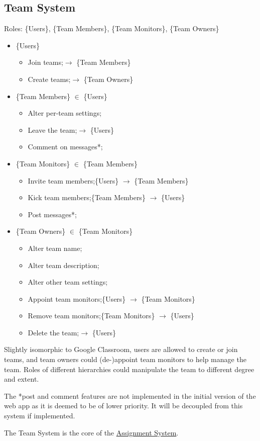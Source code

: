 \documentclass[12pt]{report}
\newcommand{\n}{\par}
\newcommand{\br}{\vspace{1 em}\n}
\begin{document}
\subsection{Team System} \label{overview.project-objectives.team-system}
Roles: \{Users\}, \{Team Members\}, \{Team Monitors\}, \{Team Owners\}\n
\begin{itemize}
	\item \{Users\}
	      \begin{itemize}
		      \item Join teams;\null\hfill $\rightarrow$ \{Team Members\}
		      \item Create teams;\null\hfill $\rightarrow$ \{Team Owners\}
	      \end{itemize}
	\item \{Team Members\} $\in$ \{Users\}
	      \begin{itemize}
		      \item Alter per-team settings;
		      \item Leave the team;\null\hfill $\rightarrow$ \{Users\}
		      \item Comment on messages*;
	      \end{itemize}
	\item \{Team Monitors\} $\in$ \{Team Members\}
	      \begin{itemize}
		      \item Invite team members;\null\hfill \{Users\} $\rightarrow$ \{Team Members\}
		      \item Kick team members;\null\hfill \{Team Members\} $\rightarrow$ \{Users\}
		      \item Post messages*;
	      \end{itemize}
	\item \{Team Owners\} $\in$ \{Team Monitors\}
	      \begin{itemize}
		      \item Alter team name;
		      \item Alter team description;
		      \item Alter other team settings;
		      \item Appoint team monitors;\null\hfill \{Users\} $\rightarrow$ \{Team Monitors\}
		      \item Remove team monitors;\null\hfill \{Team Monitors\} $\rightarrow$ \{Users\}
		      \item Delete the team;\null\hfill $\rightarrow$ \{Users\}
	      \end{itemize}
\end{itemize}\n
Slightly isomorphic to Google Classroom,
users are allowed to create or join teams, and team owners could (de-)appoint team monitors to help manage the team.
Roles of different hierarchies could manipulate the team to different degree and extent.
\br
The *post and comment features are not implemented in the initial version of the web app
as it is deemed to be of lower priority. It will be decoupled from this system if implemented.
\br
The Team System is the core of the \hyperref[overview.project-objectives.assignment-system]{Assignment System}.
\newpage
\end{document}

